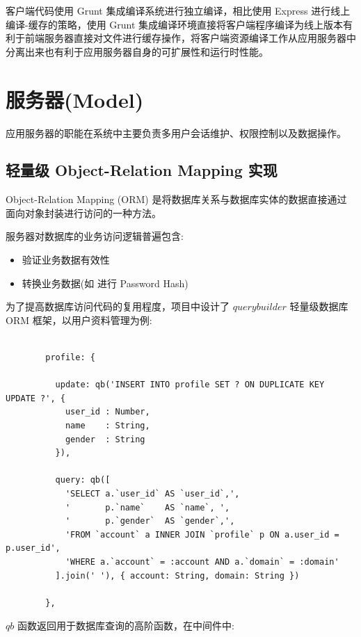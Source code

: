 客户端代码使用 Grunt 集成编译系统进行独立编译，相比使用 Express 进行线上编译-缓存的策略，使用 Grunt 集成编译环境直接将客户端程序编译为线上版本有利于前端服务器直接对文件进行缓存操作，将客户端资源编译工作从应用服务器中分离出来也有利于应用服务器自身的可扩展性和运行时性能。

\section{服务器(Model)}

应用服务器的职能在系统中主要负责多用户会话维护、权限控制以及数据操作。

\subsection{轻量级 Object-Relation Mapping 实现}

Object-Relation Mapping (ORM) 是将数据库关系与数据库实体的数据直接通过面向对象封装进行访问的一种方法。

服务器对数据库的业务访问逻辑普遍包含:

\begin{itemize}
  \item 验证业务数据有效性
  \item 转换业务数据(如 进行 Password Hash)
\end{itemize}

为了提高数据库访问代码的复用程度，项目中设计了 $querybuilder$ 轻量级数据库 ORM 框架，以用户资料管理为例:

\begin{verbatim}

        profile: {

          update: qb('INSERT INTO profile SET ? ON DUPLICATE KEY UPDATE ?', {
            user_id : Number,
            name    : String,
            gender  : String
          }),

          query: qb([
            'SELECT a.`user_id` AS `user_id`,',
            '       p.`name`    AS `name`, ',
            '       p.`gender`  AS `gender`,',
            'FROM `account` a INNER JOIN `profile` p ON a.user_id = p.user_id',
            'WHERE a.`account` = :account AND a.`domain` = :domain'
          ].join(' '), { account: String, domain: String })

        },

\end{verbatim}

$qb$ 函数返回用于数据库查询的高阶函数，在中间件中:

